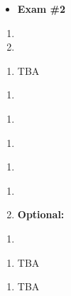 \documentclass{article}
\begin{document}
\week{}
\dia{}
\Review{}
\dia{}
\begin{itemize}
\item[ ] \textbf{Exam \#2}
\end{itemize}



\dia{}
\begin{enumerate}
\item {}
\item {}
\end{enumerate}

\dia{}
\begin{enumerate}
\item TBA
\end{enumerate}


\dia{}
\begin{enumerate}
\item {}%
\end{enumerate}

\dia{}
\begin{enumerate}
\item {}
\end{enumerate}



\dia{}
\begin{enumerate}
\item {}
\end{enumerate}

\dia{}
\begin{enumerate}
\item {}
\end{enumerate}


\dia{}
\begin{enumerate}
\item {}
\item[ ] \textbf{Optional:} 
\end{enumerate}

\dia{}
\begin{enumerate}
\item {}
\end{enumerate}


\dia{}
\begin{enumerate}
\item TBA
\end{enumerate}

\dia{} 
\begin{enumerate}
\item TBA
\end{enumerate}

\week{}
\dia{}
\Review{}
\end{document}
